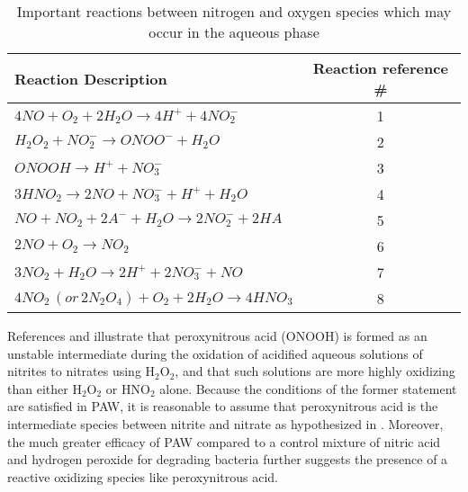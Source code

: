 \begin{table}[htpb]
  \begin{center}
    \begin{tabular}{|l |c |}
      \hline
      \textbf{Reaction Description} & \textbf{Reaction reference \#} \\\hline
      $4NO + O_2 + 2H_2O \rightarrow 4H^+ + 4NO_2^-$ & 1 \\\hline
      $H_2O_2 + NO_2^- \rightarrow ONOO^- + H_2O$ & 2 \\\hline
      $ONOOH \rightarrow H^+ + NO_3^-$ & 3 \\\hline
      $3HNO_2 \rightarrow 2NO + NO_3^- + H^+ + H_2O$ & 4 \\\hline
      $NO + NO_2 + 2A^- + H_2O \rightarrow 2NO_2^- + 2HA$ & 5 \\\hline
      $2NO + O_2 \rightarrow NO_2$ & 6 \\\hline
      $3NO_2 + H_2O \rightarrow 2H^+ + 2NO_3^- + NO$ & 7 \\\hline
      $4NO_2\,(or\,2N_2O_4) + O_2 + 2H_2O \rightarrow 4HNO_3$ & 8 \\\hline
    \end{tabular}
  \end{center}
  \caption{Important reactions between nitrogen and oxygen species which may occur in the aqueous phase}
  \label{tab:reactions}
\end{table}

References \cite{greenwood1984chemistry} and \cite{Lukes2014b} illustrate that peroxynitrous acid (ONOOH) is formed as an unstable intermediate during the oxidation of acidified aqueous solutions of nitrites to nitrates using H$_2$O$_2$, and that such solutions are more highly oxidizing than either H$_2$O$_2$ or HNO$_2$ alone.  Because the conditions of the former statement are satisfied in PAW, it is reasonable to assume that peroxynitrous acid is the intermediate species between nitrite and nitrate as hypothesized in \cite{traylor2011long}.  Moreover, the much greater efficacy of PAW compared to a control mixture of nitric acid and hydrogen peroxide for degrading bacteria \cite{burlica2010bacteria} further suggests the presence of a reactive oxidizing species like peroxynitrous acid.

